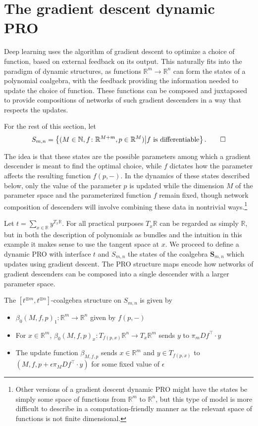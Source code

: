 \documentclass[11pt, one side, article]{memoir}
\theoremstyle{definition}
\theoremstyle{plain}
\newenvironment{definition}
  {\pushQED{\qed}\renewcommand{\qedsymbol}{$\lozenge$}\definitionx}
  {\popQED\enddefinitionx}
\newcommand{\Cat}[1]{\mathbf{#1}}%
\newcommand{\nn}{\mathbb{N}}
\newcommand{\rr}{\mathbb{R}}
\newcommand{\0}{\textsf{0}}
\newcommand{\1}{\tn{\textsf{1}}}
\renewcommand{\S}{{\Cat{S}}}
\begin{document}
\section{The gradient descent dynamic PRO}

Deep learning uses the algorithm of gradient descent to optimize a choice of function, based on external feedback on its output. This naturally fits into the paradigm of dynamic structures, as functions $\rr^m \to \rr^n$ can form the states of a polynomial coalgebra, with the feedback providing the information needed to update the choice of function. These functions can be composed and juxtaposed to provide compositions of networks of such gradient descenders in a way that respects the updates.

\begin{definition}
For the rest of this section, let 
\[
S_{m,n} = \left\{(M \in \nn, f\colon \rr^{M+m}, p \in \rr^M) \middle| f \textrm{ is differentiable}\right\}.
\qedhere
\]
\end{definition}

The idea is that these states are the possible parameters among which a gradient descender is meant to find the optimal choice, while $f$ dictates how the parameter affects the resulting function $f(p,-)$. In the dynamics of these states described below, only the value of the parameter $p$ is updated while the dimension $M$ of the parameter space and the parameterized function $f$ remain fixed, though network composition of descenders will involve combining these data in nontrivial ways.\footnote{Other versions of a gradient descent dynamic PRO might have the states be simply some space of functions from $\rr^m$ to $\rr^n$, but this type of model is more difficult to describe in a computation-friendly manner as the relevant space of functions is not finite dimensional.}

Let $t = \sum_{x \in \rr} y^{T_x \rr}$.  For all practical purposes $T_x \rr$ can be regarded as simply $\rr$, but in both the description of polynomials as bundles and the intuition in this example it makes sense to use the tangent space at $x$. We proceed to define a dynamic PRO with interface $t$ and $S_{m,n}$ the states of the coalgebra $\S_{m,n}$ which updates using gradient descent. The PRO structure maps encode how networks of gradient descenders can be composed into a single descender with a larger parameter space.

\begin{definition}
The $[t^{\otimes m},t^{\otimes n}]$-coalgebra structure on $S_{m,n}$ is given by 
\begin{itemize}
	\item $\beta_0(M,f,p)_1\colon \rr^m \to \rr^n$ given by $f(p,-)$
	\item For $x \in \rr^m$, $\beta_0(M,f,p)_x\colon T_{f(p,x)} \rr^n \to T_x \rr^m$ sends $y$ to $\pi_m Df^\top \cdot y$
	\item The update function $\beta_{M,f,p}$ sends $x \in \rr^m$ and $y \in T_{f(p,x)}$ to $(M,f,p+\epsilon \pi_M Df^\top \cdot y)$ for some fixed value of $\epsilon$
\end{itemize}
\end{definition}
\end{document}
